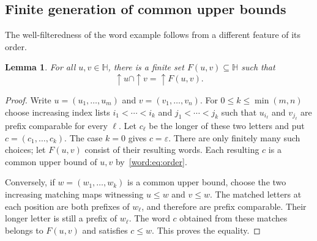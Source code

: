 \documentclass[10pt,a4paper]{article}
\newtheorem{lemma}[theorem]{Lemma}
\theoremstyle{definition}
\newcommand{\HH}{\mathbb H}
\begin{document}
\subsection{Finite generation of common upper bounds}
The well-filteredness of the word example follows from a different feature of its order.

\begin{lemma}\label{word:finite-upper-bounds}
For all $u,v\in\HH$, there is a finite set $F(u,v)\subseteq\HH$ such that
\[
 {\uparrow} u\cap{\uparrow} v={\uparrow} F(u,v).
\]
\end{lemma}
\begin{proof}
Write $u=(u_1,\ldots,u_m)$ and $v=(v_1,\ldots,v_n)$. For $0\leq k\leq\min(m,n)$ choose increasing index lists $i_1<\cdots<i_k$ and $j_1<\cdots<j_k$ such that $u_{i_\ell}$ and $v_{j_\ell}$ are prefix comparable for every $\ell$. Let $c_\ell$ be the longer of these two letters and put $c=(c_1,\ldots,c_k)$. The case $k=0$ gives $c=\varepsilon$. There are only finitely many such choices; let $F(u,v)$ consist of their resulting words. Each resulting $c$ is a common upper bound of $u,v$ by~\eqref{word:eq:order}.

Conversely, if $w=(w_1,\ldots,w_k)$ is a common upper bound, choose the two increasing matching maps witnessing $u\leq w$ and $v\leq w$. The matched letters at each position are both prefixes of $w_\ell$, and therefore are prefix comparable. Their longer letter is still a prefix of $w_\ell$. The word $c$ obtained from these matches belongs to $F(u,v)$ and satisfies $c\leq w$. This proves the equality.
\end{proof}
\end{document}
